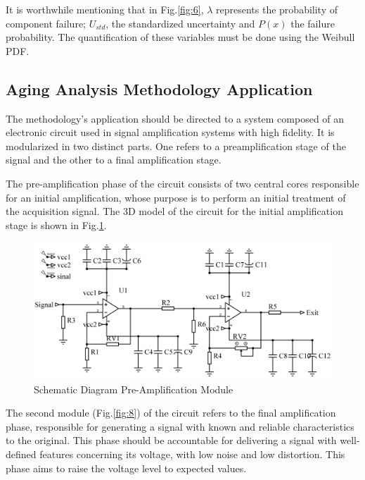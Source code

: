\documentclass{ws-m3as}
\begin{document}
It is worthwhile mentioning that in Fig.\ref{fig:6}, $\lambda$ represents the probability of component failure; $U_{std}$, the standardized uncertainty and $P(x)$ the failure probability. The quantification of these variables must be done using the Weibull PDF.

\subsection{Aging Analysis Methodology Application}

The methodology's application should be directed to a system composed of an electronic circuit used in signal amplification systems with high fidelity. It is modularized in two distinct parts. One refers to a preamplification stage of the signal and the other to a final amplification stage.

The pre-amplification phase of the circuit consists of two central cores responsible for an initial amplification, whose purpose is to perform an initial treatment of the acquisition signal. The 3D model of the circuit for the initial amplification stage is shown in Fig.\ref{fig:7}.

\begin{figure}[H]
	\centering  
	\includegraphics[width=0.9\linewidth]{Figures/SchematicPreamp}
	\caption{Schematic Diagram Pre-Amplification Module}
	\label{fig:7}
\end{figure}

The second module (Fig.\ref{fig:8}) of the circuit refers to the final amplification phase, responsible for generating a signal with known and reliable characteristics to the original. This phase should be accountable for delivering a signal with well-defined features concerning its voltage, with low noise and low distortion. This phase aims to raise the voltage level to expected values.
\end{document}
